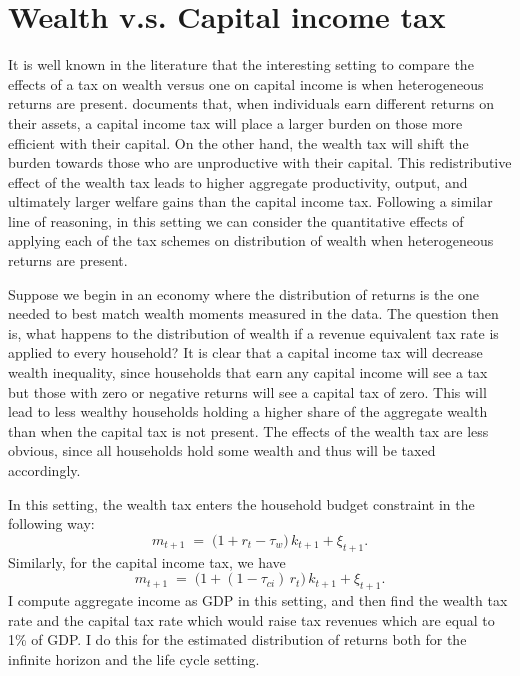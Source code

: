 \onlyinsubfile{\setcounter{section}{4}}
\section{Wealth v.s. Capital income tax}
\notinsubfile{\label{sec:Tax}}

\par It is well known in the literature that the interesting setting to compare the effects of a tax on wealth versus one on capital income is when heterogeneous returns are present. \cite{Guvenen2023} documents that, when individuals earn different returns on their assets, a capital income tax will place a larger burden on those more efficient with their capital. On the other hand, the wealth tax will shift the burden towards those who are unproductive with their capital. This redistributive effect of the wealth tax leads to higher aggregate productivity, output, and ultimately larger welfare gains than the capital income tax. Following a similar line of reasoning, in this setting we can consider the quantitative effects of applying each of the tax schemes on distribution of wealth when heterogeneous returns are present.

\par Suppose we begin in an economy where the distribution of returns is the one needed to best match wealth moments measured in the data. The question then is, what happens to the distribution of wealth if a revenue equivalent tax rate is applied to every household? It is clear that a capital income tax will decrease wealth inequality, since households that earn any capital income will see a tax but those with zero or negative returns will see a capital tax of zero. This will lead to less wealthy households holding a higher share of the aggregate wealth than when the capital tax is not present. The effects of the wealth tax are less obvious, since all households hold some wealth and thus will be taxed accordingly. 

\par In this setting, the wealth tax enters the household budget constraint in the following way:
\[
m_{t+1} \;=\; \big(1 + r_t - \tau_w\big)\,k_{t+1} + \xi_{t+1}.
\] Similarly, for the capital income tax, we have
\[
m_{t+1} \;=\; \big(1 + (1-\tau_{ci})\,r_t\big)\,k_{t+1} + \xi_{t+1}.
\] I compute aggregate income as GDP in this setting, and then find the wealth tax rate and the capital tax rate which would raise tax revenues which are equal to 1\% of GDP. I do this for the estimated distribution of returns both for the infinite horizon and the life cycle setting.

